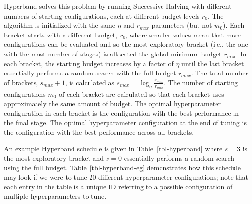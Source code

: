 Hyperband solves this problem by running Successive Halving with
different numbers of starting configurations, each at different budget
levels \(r_{0}\). The algorithm is initialized with the same \(\eta\)
and \(r_{max}\) parameters (but not \(m_0\)). Each bracket starts with a
different budget, \(r_0\), where smaller values mean that more
configurations can be evaluated and so the most exploratory bracket
(i.e., the one with the most number of stages) is allocated the global
minimum budget \(r_{min}\). In each bracket, the starting budget
increases by a factor of \(\eta\) until the last bracket essentially
performs a random search with the full budget \(r_{max}\). The total
number of brackets, \(s_{max} + 1\), is calculated as
\(s_{max} = {\log_\eta \frac{r_{max}}{r_{min}}}\). The number of
starting configurations \(m_0\) of each bracket are calculated so that
each bracket uses approximately the same amount of budget. The optimal
hyperparameter configuration in each bracket is the configuration with
the best performance in the final stage. The optimal hyperparameter
configuration at the end of tuning is the configuration with the best
performance across all brackets.

An example Hyperband schedule is given in Table~\ref{tbl-hyperband}
where \(s = 3\) is the most exploratory bracket and \(s = 0\)
essentially performs a random search using the full budget.
Table~\ref{tbl-hyperband-eg} demonstrates how this schedule may look if
we were to tune 20 different hyperparameter configurations; note that
each entry in the table is a unique ID referring to a possible
configuration of multiple hyperparameters to tune.


